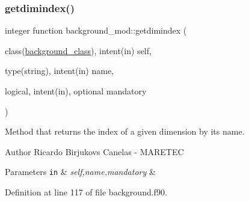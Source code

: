 \subsubsection{\texorpdfstring{getdimindex()}{getdimindex()}}
{\footnotesize\ttfamily integer function background\+\_\+mod\+::getdimindex (\begin{DoxyParamCaption}\item[{class(\mbox{\hyperlink{structbackground__mod_1_1background__class}{background\+\_\+class}}), intent(in)}]{self,  }\item[{type(string), intent(in)}]{name,  }\item[{logical, intent(in), optional}]{mandatory }\end{DoxyParamCaption})\hspace{0.3cm}{\ttfamily [private]}}



Method that returns the index of a given dimension by it\textquotesingle{}s name. 

\begin{DoxyAuthor}{Author}
Ricardo Birjukovs Canelas -\/ M\+A\+R\+E\+T\+EC 
\end{DoxyAuthor}

\begin{DoxyParams}[1]{Parameters}
\mbox{\tt in}  & {\em self,name,mandatory} & \\
\hline
\end{DoxyParams}


Definition at line 117 of file background.\+f90.


